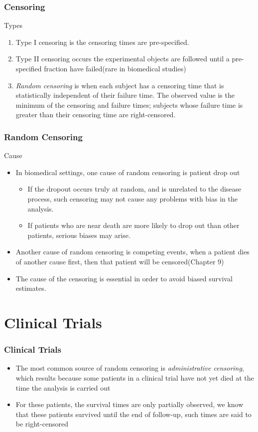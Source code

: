 \documentclass{beamer}
\newcommand{\empr}[1]{{\emph{\color{red}#1}}}
\begin{document}
\pagebreak
\begin{frame}
\frametitle{Censoring}
Types
\begin{enumerate}
	\item Type I censoring is the censoring times are pre-specified.
	\item Type II censoring occurs the experimental objects are followed until a pre-specified fraction have failed(rare in biomedical studies)
	\item \empr{Random censoring} is when each subject has a censoring time that is statistically independent of their failure time. The observed value is the minimum of the censoring and failure times; subjects whose failure time is greater than their censoring time are right-censored.
\end{enumerate}
\end{frame}

\pagebreak
\begin{frame}
\frametitle{ Random Censoring}
Cause
\begin{itemize}	
	\item In biomedical settings, one cause of random censoring is patient {\color{red}drop out}
	\begin{itemize}
	\item If the dropout occurs truly at random, and is unrelated to the disease process, such censoring may not cause any problems with bias in the analysis.
	\item If patients who are near death are more likely to drop out than other patients, serious biases may arise.
	\end{itemize}
    \item Another cause of random censoring is {\color{red}competing events}, when a patient dies of another cause first, then that patient will be censored(Chapter 9)
	\item The cause of the censoring is essential in order to avoid biased survival estimates.
\end{itemize}
\end{frame}

\section{Clinical Trials}
\begin{frame}
\frametitle{Clinical Trials}
\begin{itemize}	
	\item The most common source of random censoring is \empr{administrative censoring}, which results because some patients in a clinical trial have not yet died at the time the analysis is carried out
	\item For these patients, the survival times are only partially observed, we know that these patients survived until the end of follow-up, such times are said to be right-censored
\end{itemize}
\end{frame}
\end{document}
